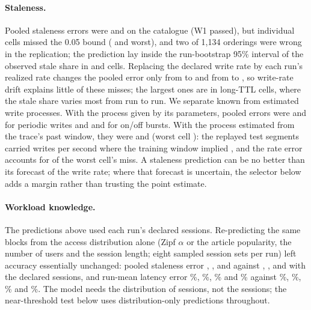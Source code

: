 \documentclass[acmsmall,review,nonacm]{acmart}
\begin{document}
\paragraph{Staleness.}
Pooled staleness errors were \revTWone{} and \revRWone{} on the catalogue (W1 passed), but individual cells missed the 0.05 bound (\revTWtwo{} and \revRWtwo{} worst), and two of 1{,}134 orderings were wrong in the replication; the prediction lay inside the run-bootstrap 95\% interval of the observed stale share in \revTInside{} and \revRInside{} cells. Replacing the declared write rate by each run's realized rate changes the pooled error only from \diagDecrevTDeclared{} to \diagDecrevTRealized{} and from \diagDecrevRDeclared{} to \diagDecrevRRealized{}, so write-rate drift explains little of these misses; the largest ones are in long-TTL cells, where the stale share varies most from run to run. We separate known from estimated write processes. With the process given by its parameters, pooled errors were \revBTwoTPeriodicMae{} and \revBTwoRPeriodicMae{} for periodic writes and \revBTwoTOnoffMae{} and \revBTwoROnoffMae{} for on/off bursts. With the process estimated from the trace's past window, they were \revBTwoTTraceMae{} and \revBTwoRTraceMae{} (worst cell \revBTwoTTraceMax): the replayed test segments carried \diagTraceRate{} writes per second where the training window implied \diagTraceDeclared, and the rate error accounts for \diagDecTraceRate{} of the worst cell's \diagDecTraceTotal{} miss. A staleness prediction can be no better than its forecast of the write rate; where that forecast is uncertain, the selector below adds a margin rather than trusting the point estimate.

\paragraph{Workload knowledge.}
The predictions above used each run's declared sessions. Re-predicting the same blocks from the access distribution alone (Zipf $\alpha$ or the article popularity, the number of users and the session length; eight sampled session sets per run) left accuracy essentially unchanged: pooled staleness error \distrevTWoneDist{}, \distrevRWoneDist{}, \distcdTWoneDist{} and \distcdRWoneDist{} against \distrevTWoneDec{}, \distrevRWoneDec{}, \distcdTWoneDec{} and \distcdRWoneDec{} with the declared sessions, and run-mean latency error \distrevTLoneDist\%, \distrevRLoneDist\%, \distcdTLoneDist\% and \distcdRLoneDist\% against \distrevTLoneDec\%, \distrevRLoneDec\%, \distcdTLoneDec\% and \distcdRLoneDec\%. The model needs the distribution of sessions, not the sessions; the near-threshold test below uses distribution-only predictions throughout.
\end{document}
